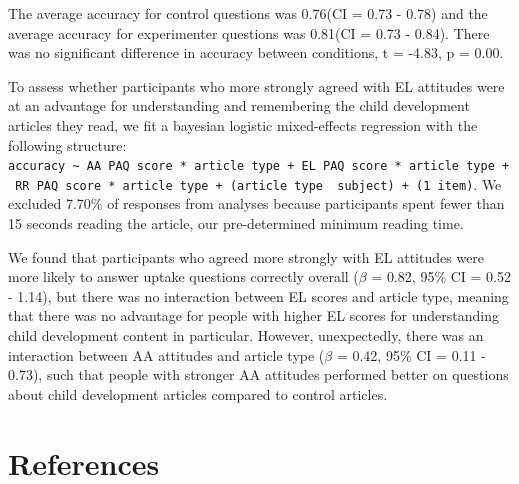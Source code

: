 \documentclass[man]{apa6}
\theoremstyle{definition}
\theoremstyle{definition}
\theoremstyle{definition}
\theoremstyle{remark}
\begin{document}
The average accuracy for control questions was 0.76(CI = 0.73 - 0.78)
and the average accuracy for experimenter questions was 0.81(CI = 0.73 -
0.84). There was no significant difference in accuracy between
conditions, t = -4.83, p = 0.00.

To assess whether participants who more strongly agreed with EL
attitudes were at an advantage for understanding and remembering the
child development articles they read, we fit a bayesian logistic
mixed-effects regression with the following structure:
\texttt{accuracy\ \textasciitilde{}\ AA\ PAQ\ score\ *\ article\ type\ +\ EL\ PAQ\ score\ *\ article\ type\ +\ RR\ PAQ\ score\ *\ article\ type\ +\ (article\ type\ \textbar{}\ subject)\ +\ (1\textbar{}\ item)}.
We excluded 7.70\% of responses from analyses because participants spent
fewer than 15 seconds reading the article, our pre-determined minimum
reading time.

We found that participants who agreed more strongly with EL attitudes
were more likely to answer uptake questions correctly overall (\(\beta\)
= 0.82, 95\% CI = 0.52 - 1.14), but there was no interaction between EL
scores and article type, meaning that there was no advantage for people
with higher EL scores for understanding child development content in
particular. However, unexpectedly, there was an interaction between AA
attitudes and article type (\(\beta\) = 0.42, 95\% CI = 0.11 - 0.73),
such that people with stronger AA attitudes performed better on
questions about child development articles compared to control articles.

\newpage

\section{References}\label{references}

\begingroup
\setlength{\parindent}{-0.5in} \setlength{\leftskip}{0.5in}

\hypertarget{refs}{}

\endgroup
\end{document}
